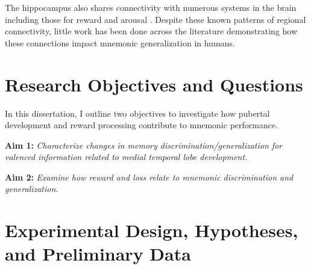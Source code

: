 \documentclass[11pt]{article}
\providecommand\citep{\cite}
\begin{document}
The
hippocampus also shares connectivity with numerous systems in the brain including those for reward
\citep{lisman_neohebbian_2011,kempadoo_dopamine_2016} and arousal
\citep{yang_bla_2016,yang_bla_2017}. Despite these known patterns of
regional connectivity, little work has been done across the literature demonstrating how
these connections impact mnemonic generalization in humans. 

\section*{Research Objectives and Questions}
In this dissertation, I outline two objectives to investigate how pubertal
development and reward processing contribute to
mnemonic performance.\par
\textbf{Aim 1: }\textit{Characterize changes in memory discrimination/generalization for valenced
    information related to medial temporal lobe development.} \par
\textbf{Aim 2: }\textit{Examine how reward and loss relate to mnemonic
    discrimination and generalization.} \par

\section*{Experimental Design, Hypotheses, and Preliminary Data}
\end{document}
